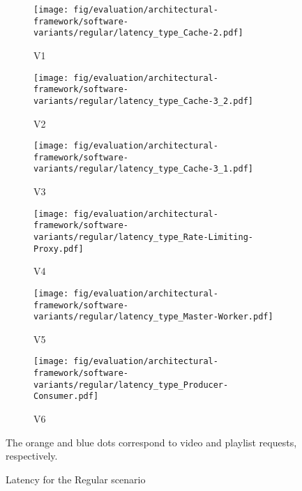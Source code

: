 \begin{figure}[p]
	\centering
	\begin{subfigure}[b]{0.48\textwidth}
		\texttt{[image: fig/evaluation/architectural-framework/software-variants/regular/latency\_type\_Cache-2.pdf]}
		\caption{V1}
		\label{fig:evaluation--im-architecture-regular-latency-cache-1}
	\end{subfigure}
	\begin{subfigure}[b]{0.48\textwidth}
		\texttt{[image: fig/evaluation/architectural-framework/software-variants/regular/latency\_type\_Cache-3\_2.pdf]}
		\caption{V2}
		\label{fig:evaluation--im-architecture-regular-latency-cache-2}
	\end{subfigure}
	\begin{subfigure}[b]{0.48\textwidth}
		\texttt{[image: fig/evaluation/architectural-framework/software-variants/regular/latency\_type\_Cache-3\_1.pdf]}
		\caption{V3}
		\label{fig:evaluation--im-architecture-regular-latency-cache}
	\end{subfigure}
	\begin{subfigure}[b]{0.48\textwidth}
		\texttt{[image: fig/evaluation/architectural-framework/software-variants/regular/latency\_type\_Rate-Limiting-Proxy.pdf]}
		\caption{V4}
		\label{fig:evaluation--im-architecture-regular-latency-rate-limiting-proxy}
	\end{subfigure}
	\begin{subfigure}[b]{0.48\textwidth}
		\texttt{[image: fig/evaluation/architectural-framework/software-variants/regular/latency\_type\_Master-Worker.pdf]}
		\caption{V5}
		\label{fig:evaluation--im-architecture-regular-latency-master-worker}
	\end{subfigure}
	\begin{subfigure}[b]{0.48\textwidth}
		\texttt{[image: fig/evaluation/architectural-framework/software-variants/regular/latency\_type\_Producer-Consumer.pdf]}
		\caption{V6}
		\label{fig:evaluation--im-architecture-regular-latency-producer-consumer}
	\end{subfigure}
	\caption{Latency for the Regular scenario}
	\label{fig:evaluation--im-architecture-regular-latency-by-request-type}
	The orange and blue dots correspond to video and playlist requests, respectively.
\end{figure}

